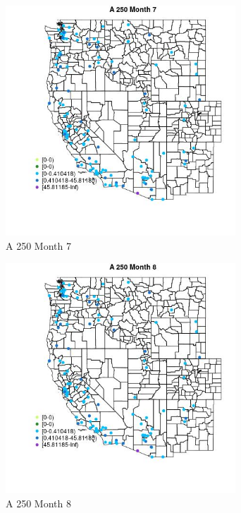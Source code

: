 \begin{figure} 
\centering  
\includegraphics[width=0.77\textwidth]{Code_Outputs/Report_ML_input_PM25_Step4_part_e_de_duplicated_aves_MapObsMo7A_250.jpg} 
\caption{\label{fig:Report_ML_input_PM25_Step4_part_e_de_duplicated_avesMapObsMo7A_250}A 250 Month 7} 
\end{figure} 
 

\begin{figure} 
\centering  
\includegraphics[width=0.77\textwidth]{Code_Outputs/Report_ML_input_PM25_Step4_part_e_de_duplicated_aves_MapObsMo8A_250.jpg} 
\caption{\label{fig:Report_ML_input_PM25_Step4_part_e_de_duplicated_avesMapObsMo8A_250}A 250 Month 8} 
\end{figure} 
 

